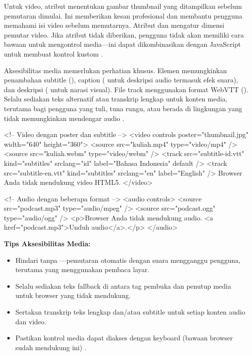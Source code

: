 Untuk video, atribut  menentukan gambar thumbnail yang ditampilkan sebelum pemutaran dimulai. Ini memberikan kesan profesional dan membantu pengguna memahami isi video sebelum memutarnya. Atribut  dan  mengatur dimensi pemutar video. Jika atribut  tidak diberikan, pengguna tidak akan memiliki cara bawaan untuk mengontrol media---ini dapat dikombinasikan dengan JavaScript untuk membuat kontrol kustom \cite{whatwgHtml}.

Aksesibilitas media memerlukan perhatian khusus. Elemen  memungkinkan penambahan subtitle (), caption ( untuk deskripsi audio termasuk efek suara), dan deskripsi ( untuk narasi visual). File track menggunakan format WebVTT (). Selalu sediakan teks alternatif atau transkrip lengkap untuk konten media, terutama bagi pengguna yang tuli, tuna rungu, atau berada di lingkungan yang tidak memungkinkan mendengar audio \cite{mdnAccessibility}.

\begin{webcode}[language=HTML, caption={Video dengan subtitle track dan audio dengan fallback}]
<!-- Video dengan poster dan subtitle -->
<video controls poster="thumbnail.jpg"
       width="640" height="360">
  <source src="kuliah.mp4" type="video/mp4" />
  <source src="kuliah.webm" type="video/webm" />
  <track src="subtitle-id.vtt" kind="subtitles"
         srclang="id" label="Bahasa Indonesia"
         default />
  <track src="subtitle-en.vtt" kind="subtitles"
         srclang="en" label="English" />
  Browser Anda tidak mendukung video HTML5.
</video>

<!-- Audio dengan beberapa format -->
<audio controls>
  <source src="podcast.mp3" type="audio/mpeg" />
  <source src="podcast.ogg" type="audio/ogg" />
  <p>Browser Anda tidak mendukung audio.
     <a href="podcast.mp3">Unduh audio</a>.</p>
</audio>
\end{webcode}

\begin{catatan}
\textbf{Tips Aksesibilitas Media:}
\begin{itemize}
  \item Hindari  tanpa ---pemutaran otomatis dengan suara mengganggu pengguna, terutama yang menggunakan pembaca layar.
  \item Selalu sediakan teks fallback di antara tag pembuka dan penutup media untuk browser yang tidak mendukung.
  \item Sertakan transkrip teks lengkap dan/atau subtitle untuk setiap konten audio dan video.
  \item Pastikan kontrol media dapat diakses dengan keyboard (bawaan browser sudah mendukung ini) \cite{webdevAccessibility}.
\end{itemize}
\end{catatan}

